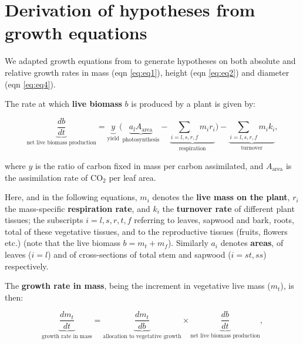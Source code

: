 \documentclass[a4paper,11pt]{article}
\begin{document}
\clearpage
\setcounter{secnumdepth}{1}
\begin{appendices}\label{sec:appendices}
\renewcommand{\thefigure}{S\arabic{figure}}
\renewcommand{\thetable}{S\arabic{table}}

\setcounter{figure}{0}
\setcounter{table}{0}

\section{Derivation of hypotheses from growth equations}\label{sec:growth}

We adapted growth equations from \cite{Falster:2011ii} to generate hypotheses on both absolute and relative growth rates in mass (eqn \ref{eq:eq1}), height (eqn \ref{eq:eq2}) and diameter (eqn \ref{eq:eq4}).

The rate at which \textbf{live biomass} $b$ is produced by a plant is given by:

\begin{equation}\label{eq:eq0}
\underbrace{\frac{db}{dt}}_{\text{net live biomass production}} = \underbrace{y}_{\text{yield}}  \big(\underbrace{a_{l} A_{\textrm{area}}}_{\text{photosynthesis}} - \underbrace{\sum_{i = l,s,r,f} m_{i} r_{i}}_{\text{respiration}}\big) - \underbrace{ \sum_{i = l,s,r,f} m_{i} k_{i}}_{\text{turnover}},
\end{equation}

where $y$ is the ratio of carbon fixed in mass per carbon assimilated,  and  $A_{\textrm{area}}$ is the assimilation rate of CO$_{2}$ per leaf area.

Here, and in the following equations, $m_i$ denotes the \textbf{live mass on the plant}, $r_i$ the mass-specific \textbf{respiration rate}, and $k_i$ the \textbf{turnover rate} of different plant tissues; the subscripts $i = l,s,r,t,f$ referring to leaves, sapwood and bark, roots, total of these vegetative tissues, and to the reproductive tissues (fruits, flowers etc.) (note that the live biomass $b = m_t +m_f$). Similarly $a_i$ denotes \textbf{areas}, of leaves ($i = l$) and of cross-sections of total stem and sapwood ($i = st,ss$) respectively.


The \textbf{growth rate in mass}, being the increment in vegetative live mass ($m_t$), is then:

\begin{equation}\label{eq:eq1}
\underbrace{{\frac{dm_t}{dt}}}_{\text{growth rate in mass}} = \underbrace{\frac{dm_t}{db}}_{\text{allocation to vegetative growth}}  \times \underbrace{\frac{db}{dt}}_{\text{net live biomass production}},
\end{equation}


\end{appendices}
\end{document}
